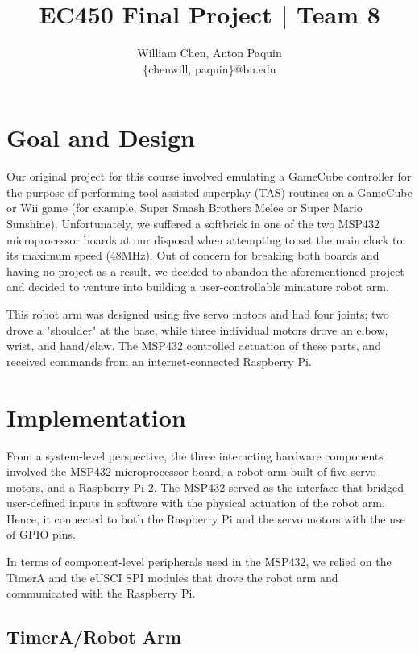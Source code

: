 \documentclass[10pt]{article}
\title{\textbf{EC450 Final Project | Team 8}}
\author{William Chen,
		Anton Paquin\\ \{chenwill, paquin\}@bu.edu}
\date{}
\begin{document}
\maketitle

\section{Goal and Design}

Our original project for this course involved emulating a GameCube controller for the purpose of performing tool-assisted superplay (TAS) routines on a GameCube or Wii game (for example, Super Smash Brothers Melee or Super Mario Sunshine). Unfortunately, we suffered a softbrick in one of the two MSP432 microprocessor boards at our disposal when attempting to set the main clock to its maximum speed (48MHz). Out of concern for breaking both boards and having no project as a result, we decided to abandon the aforementioned project and decided to venture into building a user-controllable miniature robot arm. \newline

This robot arm was designed using five servo motors and had four joints; two drove a "shoulder" at the base, while three individual motors drove an elbow, wrist, and hand/claw. The MSP432 controlled actuation of these parts, and received commands from an internet-connected Raspberry Pi.

\section{Implementation}

From a system-level perspective, the three interacting hardware components involved the MSP432 microprocessor board, a robot arm built of five servo motors, and a Raspberry Pi 2. The MSP432 served as the interface that bridged user-defined inputs in software with the physical actuation of the robot arm. Hence, it connected to both the Raspberry Pi and the servo motors with the use of GPIO pins. \newline

In terms of component-level peripherals used in the MSP432, we relied on the TimerA and the eUSCI SPI modules that drove the robot arm and communicated with the Raspberry Pi. 

\subsection{TimerA/Robot Arm}
\end{document}
